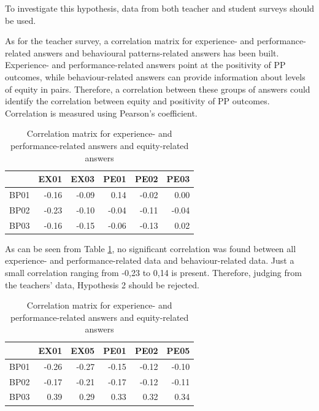 \documentclass[conference]{IEEEtran}
\begin{document}
To investigate this hypothesis, data from both teacher and student surveys should be used. 

As for the teacher survey, a correlation matrix for experience- and performance-related answers and behavioural patterns-related answers has been built. Experience- and performance-related answers point at the positivity of PP outcomes, while behaviour-related answers can provide information about levels of equity in pairs. Therefore, a correlation between these groups of answers could identify the correlation between equity and positivity of PP outcomes. Correlation is measured using Pearson's coefficient.

\begin{table}[ht]
    \centering
    \begin{tabular}{|l|r|r|r|r|r|}
    \hline
    {} &      EX01 &      EX03 & PE01 & PE02 & PE03 \\
    \hline
    BP01 & -0.16 & -0.09 & 0.14 & -0.02 & 0.00\\
    \hline
    BP02 & -0.23 & -0.10 & -0.04 & -0.11 & -0.04\\
    \hline
    BP03 & -0.16 & -0.15 & -0.06 & -0.13 & 0.02\\
    \hline
    \end{tabular}
    \caption{Correlation matrix for experience- and performance-related answers and equity-related answers}
    \label{tab:table2}
\end{table}

As can be seen from Table \ref{tab:table2}, no significant correlation was found between all experience- and performance-related data and behaviour-related data. Just a small correlation ranging from -0,23 to 0,14 is present. Therefore, judging from the teachers' data, Hypothesis 2 should be rejected.

\begin{table}[ht]
    \centering
    \begin{tabular}{|l|r|r|r|r|r|}
    \hline
    {} &      EX01 &      EX05 & PE01 & PE02 & PE05 \\
    \hline
    BP01 & -0.26 & -0.27 & -0.15 & -0.12 & -0.10 \\
    \hline
    BP02 & -0.17 & -0.21 & -0.17 & -0.12 & -0.11\\
    \hline
    BP03 &  0.39 &  0.29 & 0.33 & 0.32 & 0.34\\
    \hline
    \end{tabular}
    \caption{Correlation matrix for experience- and performance-related answers and equity-related answers}
    \label{tab:table3}
\end{table}
\end{document}
